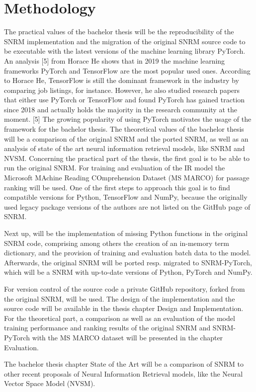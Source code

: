 \chapter{Methodology}

The practical values of the bachelor thesis will be the reproducibility of the SNRM implementation and the migration of the original SNRM source code to be executable with the latest versions of the machine learning library PyTorch.
An analysis [5] from Horace He shows that in 2019 the machine learning frameworks PyTorch and TensorFlow  are the most popular used ones.
According to Horace He, TensorFlow is still the dominant framework in the industry by comparing job listings, for instance.
However, he also studied research papers that either use PyTorch or TensorFlow and found PyTorch has gained traction since 2018 and actually holds the majority in the research community at the moment. [5] 
The growing popularity of using PyTorch motivates the usage of the framework for the bachelor thesis.
The theoretical values of the bachelor thesis will be a comparison of the original SNRM and the ported SNRM, as well as an analysis of state of the art neural information retrieval models, like SNRM and NVSM.
Concerning the practical part of the thesis, the first goal is to be able to run the original SNRM.
For training and evaluation of the IR model the Microsoft MAchine Reading COmprehension Dataset (MS MARCO) for passage ranking  will be used.
One of the first steps to approach this goal is to find compatible versions for Python, TensorFlow and NumPy, because the originally used legacy package versions of the authors are not listed on the GitHub page of SNRM.

Next up, will be the implementation of missing Python functions in the original SNRM code, comprising among others the creation of an in-memory term dictionary, and the provision of training and evaluation batch data to the model.
Afterwards, the original SNRM will be ported resp. migrated to SNRM-PyTorch, which will be a SNRM with up-to-date versions of Python, PyTorch and NumPy.

For version control of the source code a private GitHub repository, forked from the original SNRM, will be used.
The design of the implementation and the source code will be available in the thesis chapter Design and Implementation.
For the theoretical part, a comparison as well as an evaluation of the model training performance and ranking results of the original SNRM and SNRM-PyTorch with the MS MARCO dataset will be presented in the chapter Evaluation.

The bachelor thesis chapter State of the Art will be a comparison of SNRM to other recent proposals of Neural Information Retrieval models, like the Neural Vector Space Model (NVSM).
